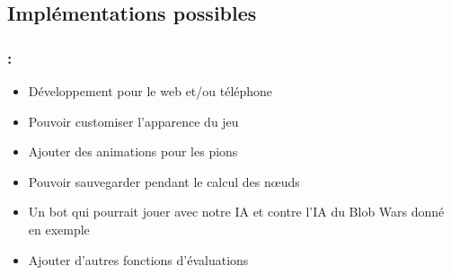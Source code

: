 \documentclass[9pt]{beamer}
\begin{document}
\subsection{Implémentations possibles}

\begin{frame}[fragile]
\frametitle{\insertsectionhead : \insertsubsectionhead}
\begin{itemize}
    \item Développement pour le web et/ou téléphone
    \vspace{3px}
    \item Pouvoir customiser l'apparence du jeu
    \vspace{3px}
    \item Ajouter des animations pour les pions
    \vspace{3px}
    \item Pouvoir sauvegarder pendant le calcul des nœuds
    \vspace{3px}
    \item Un bot qui pourrait jouer avec notre IA et contre l'IA du Blob Wars donné en exemple
    \vspace{3px}
    \item Ajouter d'autres fonctions d'évaluations
\end{itemize}
\end{frame}

\section{}
\end{document}
